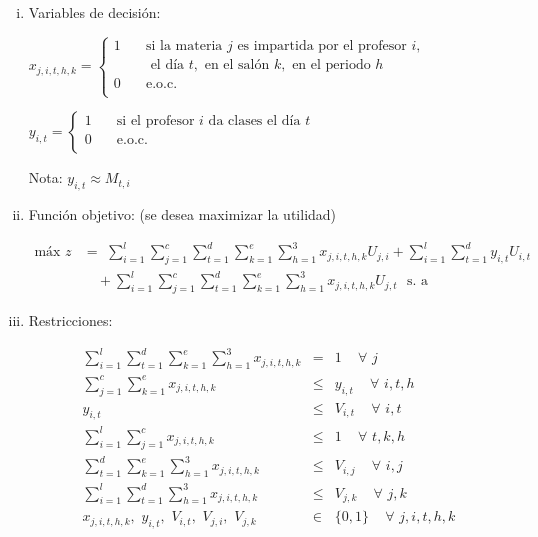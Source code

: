 \documentclass[12pt,spanish]{report}
\begin{document}
\begin{enumerate}[i)]
\item Variables de decisión:

$ x_{j,i,t,h,k} =
  \begin{cases}
1  & \quad \text{si la materia } j \text{ es impartida por el profesor  } i,\\
   &\quad \text{ el día } t, \text{ en el salón } k, \text{ en el periodo } h\\
0  & \quad \text{e.o.c. } \\
\end{cases}
$
  
$ y_{i,t} =
  \begin{cases}
1  & \quad \text{si el profesor } i \text{ da clases el día } t \\
0  & \quad \text{e.o.c. } \\
\end{cases}
$

Nota: $y_{i,t} \approx M_{t,i} $

  \item Función objetivo: (se desea maximizar la utilidad)

\begin{equation*}
\begin{split}
\text{máx} \,\, z &=  \,\, \displaystyle \sum_{i=1}^{l} \sum_{j=1}^{c} \sum_{t=1}^{d} \sum_{k=1}^{e} \sum_{h=1}^{3} x_{j,i,t,h,k} U_{j,i} + \sum_{i=1}^{l} \sum_{t=1}^{d} y_{i,t} U_{i,t} \\
&\quad  + \sum_{i=1}^{l} \sum_{j=1}^{c} \sum_{t=1}^{d} \sum_{k=1}^{e} \sum_{h=1}^{3} x_{j,i,t,h,k} U_{j,t} \,\,\,\, \text{s. a}
\end{split}
\end{equation*}

\item Restricciones:
  
  \begin{eqnarray}
\displaystyle \sum_{i=1}^{l} \sum_{t=1}^{d} \sum_{k=1}^{e} \sum_{h=1}^{3} x_{j,i,t,h,k} &=& 1  \,\,\,\,\,\,\, \forall \,\, j\\
\displaystyle \sum_{j=1}^{c} \sum_{k=1}^{e} x_{j,i,t,h,k} &\leqslant& y_{i,t} \,\,\,\,\,\,\, \forall \,\, i,t,h\\
y_{i,t} &\leqslant& V_{i,t} \,\,\,\,\,\,\, \forall \,\, i,t\\
\displaystyle \sum_{i=1}^{l} \sum_{j=1}^{c} x_{j,i,t,h,k} &\leqslant& 1 \,\,\,\,\,\,\, \forall \,\, t,k,h\\
\displaystyle \sum_{t=1}^{d} \sum_{k=1}^{e} \sum_{h=1}^{3} x_{j,i,t,h,k} &\leqslant& V_{i,j} \,\,\,\,\,\,\, \forall \,\, i,j\\
\displaystyle \sum_{i=1}^{l} \sum_{t=1}^{d} \sum_{h=1}^{3} x_{j,i,t,h,k} &\leqslant& V_{j,k}  \,\,\,\,\,\,\, \forall \,\, j,k\\
x_{j,i,t,h,k}, \,\, y_{i,t},\,\, V_{i,t}, \,\, V_{j,i}, \,\, V_{j,k} &\in& \{0,1\} \,\,\,\,\,\,\, \forall \,\, j,i,t,h,k
\end{eqnarray}
\end{enumerate}
\end{document}
